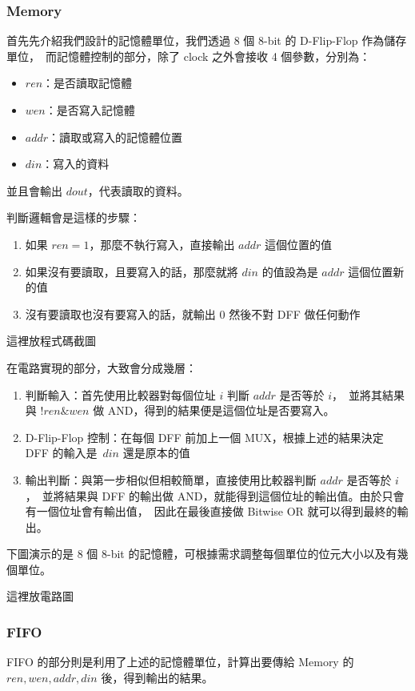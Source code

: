 \documentclass[10.5pt,compsoc,UTF8]{CjC}
\theoremstyle{mystyle}
\begin{document}
\subsubsection*{Memory}
首先先介紹我們設計的記憶體單位，我們透過 8 個 8-bit 的 D-Flip-Flop 作為儲存單位，\ 
而記憶體控制的部分，除了 clock 之外會接收 4 個參數，分別為：
\begin{itemize}
  \item $ren$：是否讀取記憶體
  \item $wen$：是否寫入記憶體
  \item $addr$：讀取或寫入的記憶體位置
  \item $din$：寫入的資料
\end{itemize}
並且會輸出 $dout$，代表讀取的資料。
\par
判斷邏輯會是這樣的步驟：
\begin{enumerate}
  \item 如果 $ren = 1$，那麼不執行寫入，直接輸出 $addr$ 這個位置的值
  \item 如果沒有要讀取，且要寫入的話，那麼就將 $din$ 的值設為是 $addr$ 這個位置新的值
  \item 沒有要讀取也沒有要寫入的話，就輸出 $0$ 然後不對 DFF 做任何動作
\end{enumerate}

這裡放程式碼截圖

在電路實現的部分，大致會分成幾層：
\begin{enumerate}
  \item 判斷輸入：首先使用比較器對每個位址 $i$ 判斷 $addr$ 是否等於 $i$，\
  並將其結果與 $!ren \& wen$ 做 AND，得到的結果便是這個位址是否要寫入。
  \item D-Flip-Flop 控制：在每個 DFF 前加上一個 MUX，根據上述的結果決定 DFF 的輸入是\
  $din$ 還是原本的值
  \item 輸出判斷：與第一步相似但相較簡單，直接使用比較器判斷 $addr$ 是否等於 $i$，\
  並將結果與 DFF 的輸出做 AND，就能得到這個位址的輸出值。由於只會有一個位址會有輸出值，\
  因此在最後直接做 Bitwise OR 就可以得到最終的輸出。
\end{enumerate}

下圖演示的是 8 個 8-bit 的記憶體，可根據需求調整每個單位的位元大小以及有幾個單位。

這裡放電路圖

\subsubsection*{FIFO}
FIFO 的部分則是利用了上述的記憶體單位，計算出要傳給 Memory 的 $ren, wen, addr, din$ 後，得到輸出的結果。
\end{document}
